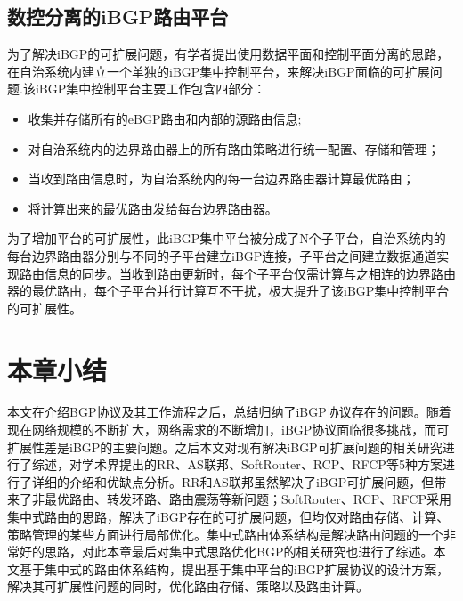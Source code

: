 \subsection{数控分离的iBGP路由平台}
为了解决iBGP的可扩展问题，有学者提出使用数据平面和控制平面分离的思路，在自治系统内建立一个单独的iBGP集中控制平台\cite{Oprescu2011Rethinking}，来解决iBGP面临的可扩展问题.该iBGP集中控制平台主要工作包含四部分：
\begin{itemize}
  \item 收集并存储所有的eBGP路由和内部的源路由信息;
  \item 对自治系统内的边界路由器上的所有路由策略进行统一配置、存储和管理；
  \item 当收到路由信息时，为自治系统内的每一台边界路由器计算最优路由；
  \item 将计算出来的最优路由发给每台边界路由器。
\end{itemize}

为了增加平台的可扩展性，此iBGP集中平台被分成了N个子平台，自治系统内的每台边界路由器分别与不同的子平台建立iBGP连接，子平台之间建立数据通道实现路由信息的同步。当收到路由更新时，每个子平台仅需计算与之相连的边界路由器的最优路由，每个子平台并行计算互不干扰，极大提升了该iBGP集中控制平台的可扩展性。


\section{本章小结}

本文在介绍BGP协议及其工作流程之后，总结归纳了iBGP协议存在的问题。随着现在网络规模的不断扩大，网络需求的不断增加，iBGP协议面临很多挑战，而可扩展性差是iBGP的主要问题。之后本文对现有解决iBGP可扩展问题的相关研究进行了综述，对学术界提出的RR、AS联邦、SoftRouter、RCP、RFCP等5种方案进行了详细的介绍和优缺点分析。RR和AS联邦虽然解决了iBGP可扩展问题，但带来了非最优路由、转发环路、路由震荡等新问题；SoftRouter、RCP、RFCP采用集中式路由的思路，解决了iBGP存在的可扩展问题，但均仅对路由存储、计算、策略管理的某些方面进行局部优化。集中式路由体系结构是解决路由问题的一个非常好的思路，对此本章最后对集中式思路优化BGP的相关研究也进行了综述。本文基于集中式的路由体系结构，提出基于集中平台的iBGP扩展协议的设计方案，解决其可扩展性问题的同时，优化路由存储、策略以及路由计算。
